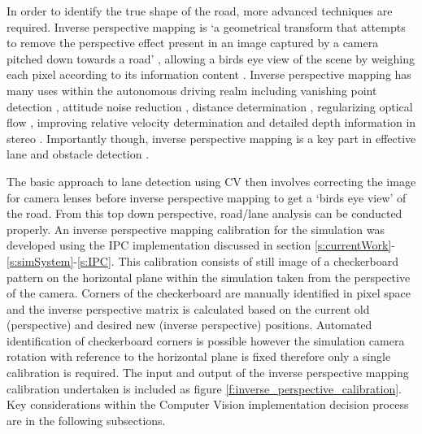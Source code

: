 \documentclass[]{aiaa-tc}%
\begin{document}
In order to identify the true shape of the road, more advanced techniques are required. Inverse perspective mapping is `a geometrical transform that attempts to remove the perspective effect present in an image captured by a camera pitched down towards a road' \citep{intersectionDetectionSingleCamera}, allowing a birds eye view of the scene by weighing each pixel according to its information content \citep{stereoIPM}. Inverse perspective mapping has many uses within the autonomous driving realm including vanishing point detection  \citep{ipmVanishingPoint}, attitude noise reduction \citep{ipmAttitudeNoise}, distance determination \citep{ipmDistanceDetermination}, regularizing optical flow \citep{ipmOpticalFlow}, improving relative velocity determination \citep{ipmOpticalFlowSpeed} and detailed depth information in stereo \citep{stereoIPM}. Importantly though, inverse perspective mapping is a key part in effective lane and obstacle detection \citep{ipmOpticalFlow} \citep{ipmDistanceDetermination} \citep{ipmBasedLaneDetectionApproach} \citep{ipmVanishingPoint}.

The basic approach to lane detection using CV then involves correcting the image for camera lenses before inverse perspective mapping to get a `birds eye view' of the road. From this top down perspective, road/lane analysis can be conducted properly. An inverse perspective mapping calibration for the simulation was developed using the IPC implementation discussed in section \ref{s:currentWork}-\ref{s:simSystem}-\ref{s:IPC}. This calibration consists of still image of a checkerboard pattern on the horizontal plane within the simulation taken from the perspective of the camera. Corners of the checkerboard are manually identified in pixel space and the inverse perspective matrix is calculated based on the current old (perspective) and desired new (inverse perspective) positions. Automated identification of checkerboard corners is possible however the simulation camera rotation with reference to the horizontal plane is fixed therefore only a single calibration is required. The input and output of the inverse perspective mapping calibration undertaken is included as figure \ref{f:inverse_perspective_calibration}. Key considerations within the Computer Vision implementation decision process are in the following subsections.
\end{document}

